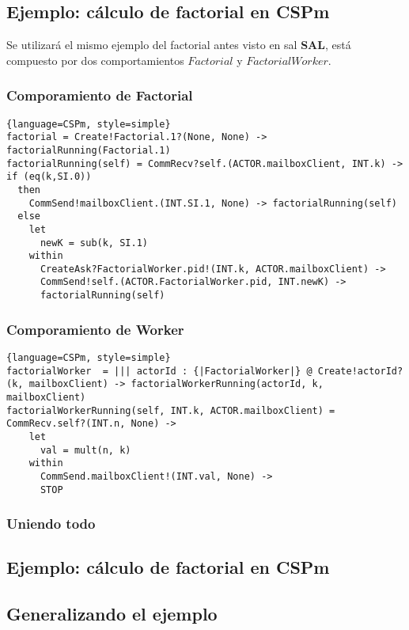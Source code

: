 \documentclass[fleqn]{article}
\begin{document}
\subsection{Ejemplo: cálculo de factorial en CSPm}
Se utilizará el mismo ejemplo del factorial antes visto en sal \textbf{SAL},
está compuesto por dos comportamientos $Factorial$ y $FactorialWorker$.

\subsubsection*{Comporamiento de Factorial}

\begin{lstlisting}{language=CSPm, style=simple}
factorial = Create!Factorial.1?(None, None) -> factorialRunning(Factorial.1)
factorialRunning(self) = CommRecv?self.(ACTOR.mailboxClient, INT.k) ->
if (eq(k,SI.0))
  then
    CommSend!mailboxClient.(INT.SI.1, None) -> factorialRunning(self)
  else
    let
      newK = sub(k, SI.1)
    within
      CreateAsk?FactorialWorker.pid!(INT.k, ACTOR.mailboxClient) ->
      CommSend!self.(ACTOR.FactorialWorker.pid, INT.newK) ->
      factorialRunning(self)
\end{lstlisting}


\subsubsection*{Comporamiento de Worker}

\begin{lstlisting}{language=CSPm, style=simple}
factorialWorker  = ||| actorId : {|FactorialWorker|} @ Create!actorId?(k, mailboxClient) -> factorialWorkerRunning(actorId, k, mailboxClient)
factorialWorkerRunning(self, INT.k, ACTOR.mailboxClient) = CommRecv.self?(INT.n, None) ->
    let
      val = mult(n, k)
    within
      CommSend.mailboxClient!(INT.val, None) ->
      STOP
\end{lstlisting}


\subsubsection*{Uniendo todo}


\subsection{Ejemplo: cálculo de factorial en CSPm}


\subsection{Generalizando el ejemplo}
\end{document}
